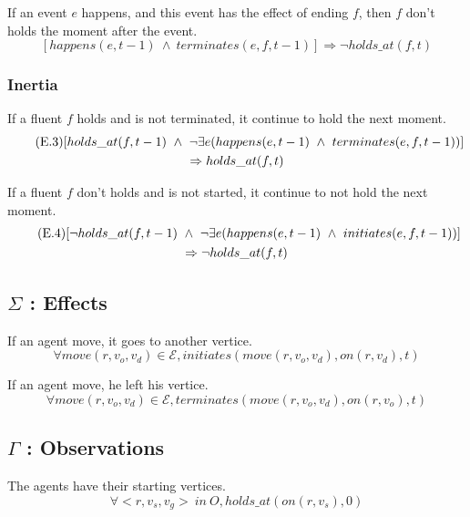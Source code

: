 If an event $e$ happens, and this event has the effect of ending $f$, then $f$ don't holds the moment after the event.
\begin{equation}
  \tag{E.2}
  [happens(e,t-1)\ \land\ terminates(e,f,t-1)] \Rightarrow \neg holds\_at(f,t)
\end{equation}

\subsubsection{Inertia}

If a fluent $f$ holds and is not terminated, it continue to hold the next moment.
\begin{multline}
  \tag{E.3}
$$[holds\_at(f,t-1)\ \land\ \neg\exists e(happens(e,t-1)\ \land\ terminates(e,f,t-1))] \\ \Rightarrow holds\_at(f,t)$$
\end{multline}

If a fluent $f$ don't holds and is not started, it continue to not hold the next moment.
\begin{multline}
  \tag{E.4}
$$[\neg holds\_at(f,t-1)\ \land\ \neg\exists e(happens(e,t-1)\ \land\ initiates(e,f,t-1))] \\ \Rightarrow\neg holds\_at(f,t)$$
\end{multline}

\subsection{$\Sigma$ : Effects}

If an agent move, it goes to another vertice.
\begin{equation}
  \tag{$\Sigma$.1}
  \forall move(r,v_o,v_d) \in \mathcal{E},initiates(move(r,v_o,v_d),on(r,v_d),t)
\end{equation}

If an agent move, he left his vertice.
\begin{equation}
  \tag{$\Sigma$.2}
  \forall move(r,v_o,v_d) \in \mathcal{E},terminates(move(r,v_o,v_d),on(r,v_o),t)
\end{equation}

\subsection{$\Gamma$ : Observations}

The agents have their starting vertices.
\begin{equation}
  \tag{$\Gamma_i$}
  \forall <r,v_s,v_g>\ in\ O,holds\_at(on(r,v_s),0)
\end{equation}

